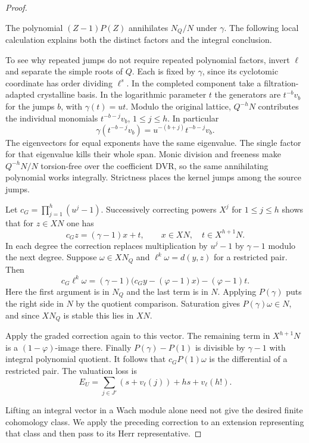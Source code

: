 \begin{proof}
\begin{itemize}
  The polynomial \((Z-1)P(Z)\) annihilates
  \(N_Q/N\) under \(\gamma\).
  The following local calculation explains both the distinct factors and the integral conclusion.
\end{itemize}
To see why repeated jumps do not require repeated polynomial factors, invert \(\ell\) and separate the simple roots of \(Q\). Each is fixed by \(\gamma\), since its cyclotomic coordinate has order dividing \(\ell^s\). In the completed component take a filtration-adapted crystalline basis. In the logarithmic parameter \(t\) the generators are \(t^{-b}v_b\) for the jumps \(b\), with \(\gamma(t)=ut\). Modulo the original lattice, \(Q^{-h}N\) contributes the individual monomials \(t^{-b-j}v_b\), \(1\le j\le h\). In particular
\[
         \gamma(t^{-b-j}v_b)=u^{-(b+j)}t^{-b-j}v_b .
\]
The eigenvectors for equal exponents have the same eigenvalue. The single factor for that eigenvalue kills their whole span. Monic division and freeness make \(Q^{-h}N/N\) torsion-free over the coefficient DVR, so the same annihilating polynomial works integrally. Strictness places the kernel jumps among the source jumps. \label{cor:full-cyclotomic-lifting-3}

Let \(c_G=\prod_{j=1}^h(u^j-1)\).
Successively correcting powers \(X^j\) for
\(1\le j\le h\) shows that for \(z\in XN\) one has
\[
 c_Gz=(\gamma-1)x+t,\qquad x\in XN,\quad t\in X^{h+1}N.
\]
In each degree the correction replaces multiplication
by \(u^j-1\) by \(\gamma-1\) modulo the next degree.
Suppose \(\omega\in XN_Q\) and
\(\ell^k\omega=d(y,z)\) for a restricted pair.
Then
\[
 c_G\ell^k\omega
   =(\gamma-1)\bigl(c_Gy-(\varphi-1)x\bigr)
                      -(\varphi-1)t.
\]
Here the first argument is in \(N_Q\) and the last
term is in \(N\). Applying \(P(\gamma)\) puts the
right side in \(N\) by the quotient comparison.
Saturation gives \(P(\gamma)\omega\in N\), and
since \(XN_Q\) is stable this lies in \(XN\).

Apply the graded correction again to this vector.
The remaining term in \(X^{h+1}N\) is a
\((1-\varphi)\)-image there.
Finally \(P(\gamma)-P(1)\) is divisible by
\(\gamma-1\) with integral polynomial quotient.
It follows that \(c_G P(1)\omega\) is the
differential of a restricted pair.
The valuation loss is
\[
 E_U = \sum_{j\in J'}(s+v_\ell(j))+hs+v_\ell(h!).
\]

Lifting an integral vector in a Wach module alone need not give the desired finite cohomology class. We apply the preceding correction to an extension representing that class and then pass to its Herr representative.



\end{proof}
